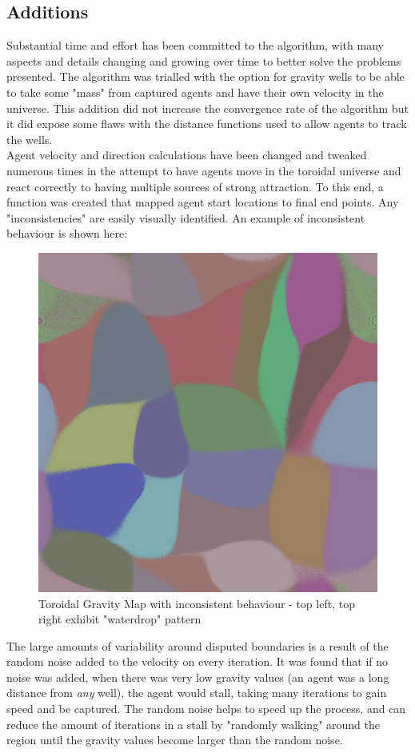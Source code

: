 \subsection{Additions}
Substantial time and effort has been committed to the algorithm, with many aspects and details changing and growing over time to better solve the problems presented. The algorithm was trialled with the option for gravity wells to be able to take some "mass" from captured agents and have their own velocity in the universe. This addition did not increase the convergence rate of the algorithm but it did expose some flaws with the distance functions used to allow agents to track the wells. \\
Agent velocity and direction calculations have been changed and tweaked numerous times in the attempt to have agents move in the toroidal universe and react correctly to having multiple sources of strong attraction. To this end, a function was created that mapped agent start locations to final end points. Any "inconsistencies" are easily visually identified. An example of inconsistent behaviour is shown here:

\begin{figure}[H]
\caption{Toroidal Gravity Map with inconsistent behaviour - top left, top right exhibit "waterdrop" pattern}
\centering
\includegraphics[width=\textwidth]{GradMap1445410689515}
\end{figure}

The large amounts of variability around disputed boundaries is a result of the random noise added to the velocity on every iteration. It was found that if no noise was added, when there was very low gravity values (an agent was a long distance from \emph{any} well), the agent would stall, taking many iterations to gain speed and be captured. The random noise helps to speed up the process, and can reduce the amount of iterations in a stall by "randomly walking" around the region until the gravity values become larger than the random noise. 
